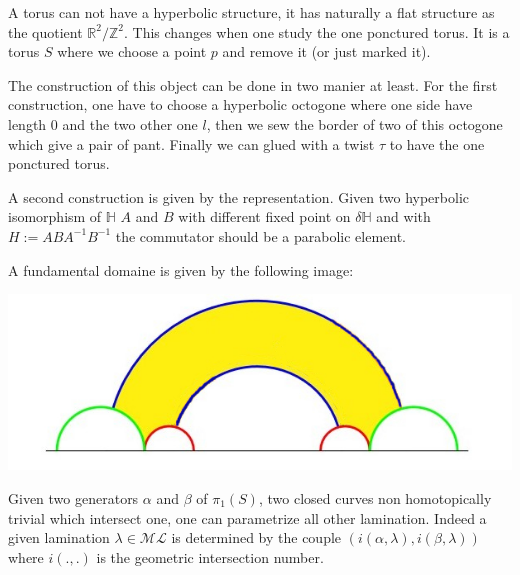 A torus can not have a hyperbolic structure, it has naturally a flat structure as the quotient $\mathbb{R}^2 / \mathbb{Z}^2$.
This changes when one study the one ponctured torus. It is a torus $S$ where we choose a point $p$ and remove it (or just marked it).

The construction of this object can be done in two manier at least.
For the first construction, one have to choose a hyperbolic octogone where one side have length $0$ and the two other one $l$, then we sew the border of two of this octogone which give a pair of pant. Finally we can glued with a twist $\tau$ to have the one ponctured torus.

A second construction is given by the representation. Given two hyperbolic isomorphism of $\mathbb{H}$ $A$ and $B$ with different fixed point on $\delta \mathbb{H}$ and with $H := ABA^{-1}B^{-1}$ the commutator should be a parabolic element.

A fundamental domaine is given by the following image:


\includegraphics{Image/OnceTorusFundamentalDomaine.jpg}

Given two generators $\alpha$ and $\beta$ of $\pi_1(S)$, two closed curves non homotopically trivial which intersect one, one can parametrize all other lamination.
Indeed a given lamination $\lambda \in \mathcal{ML}$ is determined by the couple $(i(\alpha,\lambda),i(\beta,\lambda))$ where $i(.,.)$ is the geometric intersection number.
